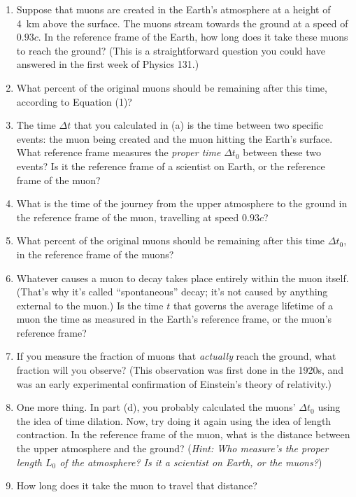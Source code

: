 \begin{enumerate}[labparts]
\item   
Suppose that muons are created in the Earth's atmosphere at a height of 4~km above the surface.  The muons stream towards the ground at a speed of $0.93c$.
In the reference frame of the Earth, how long does it take these muons to reach the ground?
(This is a straightforward question you could have answered in the first week of Physics 131.)
\answerspace{0.8in}

\item What percent of the original muons should be remaining after this time, according to Equation (1)? 
\answerspace{0.6in}

\item The time $\Delta t$ that you calculated in (a) is the time between two specific events: the muon being created and the muon hitting the Earth's surface.  What reference frame measures the \textit{proper time} $\Delta t_0$ between these two events?  Is it the reference frame of a scientist on Earth, or the reference frame of the muon?
\answerspace{0.4in}

\item What is the time of the journey from the upper atmosphere to the ground in the reference frame of the muon, travelling at speed $0.93c$?
\answerspace{0.8in}

\item What percent of the original muons should be remaining after this time $\Delta t_0$, in the reference frame of the muons?
\answerspace{0.6in}

\item Whatever causes a muon to decay takes place entirely within the muon itself.  (That's why it's called ``spontaneous'' decay; it's not caused by anything external to the muon.)  
Is the time $t$ that governs the average lifetime of a muon the time as measured in the Earth's reference frame, or the muon's reference frame?  
\answerspace{0.4in}

\item If you measure the fraction of muons that \textit{actually} reach the ground, what fraction will you observe?
(This observation was first done in the 1920s, and was an early experimental confirmation of Einstein's theory of relativity.)
\answerspace{0.4in}

\item One more thing.  In part (d), you probably calculated the muons' $\Delta t_0$ using the idea of time dilation.  Now, try doing it again using the idea of length contraction.  In the reference frame of the muon, what is the distance between the upper atmosphere and the ground?  (\textit{Hint: Who measure's the proper length $L_0$ of the atmosphere?  Is it a scientist on Earth, or the muons?})
\answerspace{0.8in}

\item How long does it take the muon to travel that distance?
\answerspace{0.6in}

\end{enumerate}

